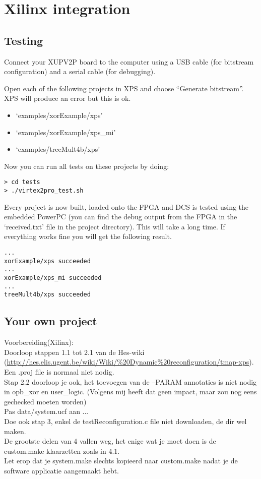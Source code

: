 \documentclass[a4paper,oneside]{memoir}
\begin{document}
\clearpage
\chapter{Xilinx integration}\label{sec:xilinx_flow}
\section{Testing}
Connect your XUPV2P board to the computer using a USB cable (for bitstream configuration) and a serial cable (for debugging).

Open each of the following projects in XPS and choose ``Generate bitstream''. XPS will produce an error but this is ok.
\begin{itemize}
\item `examples/xorExample/xps'
\item `examples/xorExample/xps\_mi'
\item `examples/treeMult4b/xps'
\end{itemize}
Now you can run all tests on these projects by doing:
\begin{lstlisting}
> cd tests
> ./virtex2pro_test.sh
\end{lstlisting}

Every project is now built, loaded onto the FPGA and DCS is tested using the embedded PowerPC (you can find the debug output from the FPGA in the `received.txt' file in the project directory). This will take a long time. If everything works fine you will get the following result.
\begin{lstlisting}
...
xorExample/xps succeeded
...
xorExample/xps_mi succeeded
...
treeMult4b/xps succeeded
\end{lstlisting}

\section{Your own project}

Voorbereiding(Xilinx):\\
Doorloop stappen 1.1 tot 2.1 van de Hes-wiki (\url{http://hes.elis.ugent.be/wiki/Wiki/%20Dynamic%20reconfiguration/tmap-xps}). Een .proj file is normaal niet nodig.\\
Stap 2.2 doorloop je ook, het toevoegen van de --PARAM annotaties is niet nodig in opb\_xor en user\_logic. (Volgens mij heeft dat geen impact, maar zou nog eens gechecked moeten worden)\\
Pas data/system.ucf aan ...\\
Doe ook stap 3, enkel de testReconfiguration.c file niet downloaden, de dir wel maken.\\
De grootste delen van 4 vallen weg, het enige wat je moet doen is de custom.make klaarzetten zoals in 4.1.\\
Let erop dat je system.make slechts kopieerd naar custom.make nadat je de software applicatie aangemaakt hebt.
\end{document}
